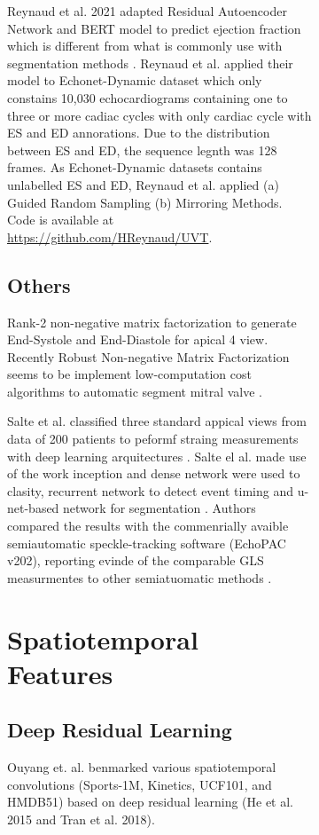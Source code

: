 \begin{figure}[H]
\begin{figure}[H]
Reynaud et al. 2021 adapted Residual Autoencoder Network and BERT model to predict ejection fraction which is different from what is commonly use with segmentation methods \cite{reynaud2021-MICCAI}.
Reynaud et al. applied their model to Echonet-Dynamic dataset which only constains 10,030 echocardiograms containing one to three or more cadiac cycles with only cardiac cycle with ES and ED annorations.
Due to the distribution between ES and ED, the sequence legnth was 128 frames.
As Echonet-Dynamic datasets contains unlabelled ES and ED, Reynaud et al. applied (a) Guided Random Sampling (b) Mirroring Methods.
Code is available at \url{https://github.com/HReynaud/UVT}.



\subsection{Others}
Rank-2 non-negative matrix factorization \cite{yuan2017} to generate End-Systole and End-Diastole for apical 4 view.  
Recently Robust Non-negative Matrix Factorization seems to be implement low-computation cost algorithms to automatic segment mitral valve \cite{dukler2018}.

Salte et al. classified three standard appical views from data of 200 patients to peformf straing measurements with deep learning arquitectures \cite{SALTE2021-JACC}.
Salte el al. made use of the work \cite{ostvik2021-TMI} inception and dense network were used to clasity, recurrent network to detect event timing and u-net-based network for segmentation \cite{SALTE2021-JACC}.
Authors compared the results with the commenrially avaible semiautomatic speckle-tracking software (EchoPAC v202), reporting evinde of the comparable GLS measurmentes to other semiatuomatic methods \cite{SALTE2021-JACC}.




\section{Spatiotemporal Features}


\subsection{Deep Residual Learning}
Ouyang et. al. benmarked various spatiotemporal convolutions (Sports-1M, Kinetics, UCF101, and HMDB51) \cite{ouyang-NeuripsML4H2019}  based on deep residual learning (He et al. 2015 and Tran et al. 2018).


\end{figure}
\end{figure}
